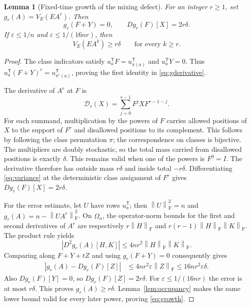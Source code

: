 \documentclass[11pt]{article}
\newtheorem{lemma}[theorem]{Lemma}
\theoremstyle{remark}\newtheorem{remark}[theorem]{Remark}
\newcommand{\Om}{\Omega_n}
\newcommand{\fn}[1]{\left\|#1\right\|_{\mathrm F}}
\newcommand{\eps}{\varepsilon}
\begin{document}
\begin{lemma}[Fixed-time growth of the mixing defect]\label{lem:mixing}
For an integer $r\ge1$, set $g_r(A)=V_E(EA^r)$. Then
\begin{equation}\label{eq:gderivative}
 g_r(F+Y)=0,\qquad Dg_r(F)[X]=2r\delta.
\end{equation}
If $\eps\le1/n$ and $\eps\le1/(16nr)$, then
\begin{equation}\label{eq:growth}
 V_E(EA^k)\ge r\delta\qquad\text{for every }k\ge r.
\end{equation}
\end{lemma}
\begin{proof}
The class indicators satisfy $u_a^{\mathsf T}F=u_{\pi(a)}^{\mathsf T}$
and $u_a^{\mathsf T}Y=0$. Thus
$u_a^{\mathsf T}(F+Y)^r=u_{\pi^r(a)}^{\mathsf T}$, proving the first
identity in \eqref{eq:gderivative}.

The derivative of $A^r$ at $F$ is
\[
 \mathcal D_r(X)=\sum_{j=0}^{r-1}F^jXF^{r-1-j}.
\]
For each summand, multiplication by the powers of $F$ carries allowed
positions of $X$ to the support of $F^r$ and disallowed positions to its
complement. This follows by following the class permutation $\pi$;
the correspondence on classes is bijective. The multipliers are doubly
stochastic, so the total mass carried from disallowed positions is
exactly $\delta$. This remains valid when one of the powers is $F^0=I$.
The derivative therefore has outside mass $r\delta$ and inside total
$-r\delta$. Differentiating \eqref{eq:variance} at the deterministic
class assignment of $F^r$ gives $Dg_r(F)[X]=2r\delta$.

For the error estimate, let $U$ have rows $u_a^{\mathsf T}$; then
$\fn U^2=n$ and $g_r(A)=n-\fn{UA^r}^2$. On $\Om$, the operator-norm
bounds for the first and second derivatives of $A^r$ are respectively
$r\fn H$ and $r(r-1)\fn H\fn K$. The product rule yields
\[
 |D^2g_r(A)[H,K]|\le4nr^2\fn H\fn K.
\]
Comparing along $F+Y+tZ$ and using $g_r(F+Y)=0$ consequently gives
\begin{align*}
 |g_r(A)-Dg_r(F)[Z]|
 &\le4nr^2\eps\fn Z\le16nr^2\eps\delta.
\end{align*}
Also $Dg_r(F)[Y]=0$, so $Dg_r(F)[Z]=2r\delta$.
For $\eps\le1/(16nr)$ the error is at most $r\delta$.
This proves $g_r(A)\ge r\delta$. Lemma~\ref{lem:occupancy} makes the
same lower bound valid for every later power, proving \eqref{eq:growth}.
\end{proof}
\end{document}

